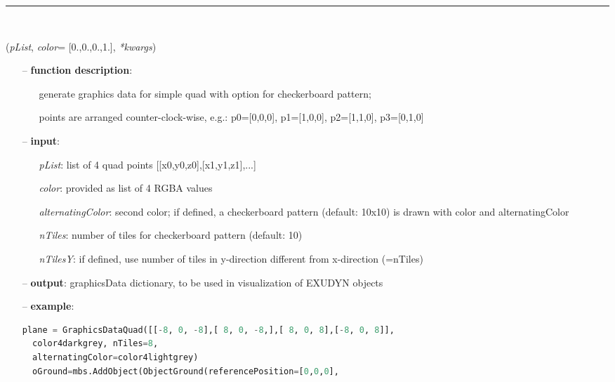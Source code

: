 \begin{itemize}[leftmargin=1.4cm]
\begin{itemize}[leftmargin=1.4cm]
\begin{itemize}[leftmargin=0.5cm]
\begin{itemize}[leftmargin=1.4cm]
\begin{itemize}[leftmargin=1.4cm]
\begin{itemize}[leftmargin=0.5cm]
\begin{itemize}[leftmargin=1.4cm]
\begin{itemize}[leftmargin=0.5cm]
%
\noindent\rule{8cm}{0.75pt}\vspace{1pt} \\ 
\begin{flushleft}
\label{sec:graphicsDataUtilities:GraphicsDataQuad}
({\it pList}, {\it color}= [0.,0.,0.,1.], {\it **kwargs})
\end{flushleft}
\setlength{\itemindent}{0.7cm}
\begin{itemize}[leftmargin=0.7cm]
\item[--]
{\bf function description}: \vspace{-6pt}
\begin{itemize}[leftmargin=1.2cm]
\setlength{\itemindent}{-0.7cm}
\item[]generate graphics data for simple quad with option for checkerboard pattern;
\item[]points are arranged counter-clock-wise, e.g.: p0=[0,0,0], p1=[1,0,0], p2=[1,1,0], p3=[0,1,0]
\end{itemize}
\item[--]
{\bf input}: \vspace{-6pt}
\begin{itemize}[leftmargin=1.2cm]
\setlength{\itemindent}{-0.7cm}
\item[]{\it pList}: list of 4 quad points [[x0,y0,z0],[x1,y1,z1],...]
\item[]{\it color}: provided as list of 4 RGBA values
\item[]{\it alternatingColor}: second color; if defined, a checkerboard pattern (default: 10x10) is drawn with color and alternatingColor
\item[]{\it nTiles}: number of tiles for checkerboard pattern (default: 10)
\item[]{\it nTilesY}: if defined, use number of tiles in y-direction different from x-direction (=nTiles)
\end{itemize}
\item[--]
{\bf output}: graphicsData dictionary, to be used in visualization of EXUDYN objects
\item[--]
{\bf example}: \vspace{-12pt}\ei\begin{lstlisting}[language=Python, xleftmargin=36pt]
  plane = GraphicsDataQuad([[-8, 0, -8],[ 8, 0, -8,],[ 8, 0, 8],[-8, 0, 8]],
  color4darkgrey, nTiles=8,
  alternatingColor=color4lightgrey)
  oGround=mbs.AddObject(ObjectGround(referencePosition=[0,0,0],

\end{lstlisting}
\end{itemize}
\end{itemize}
\end{itemize}
\end{itemize}
\end{itemize}
\end{itemize}
\end{itemize}
\end{itemize}
\end{itemize}
